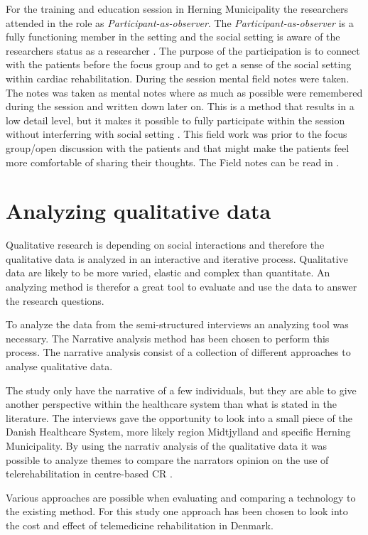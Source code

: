 For the training and education session in Herning Municipality the researchers attended in the role as \textit{Participant-as-observer}. The \textit{Participant-as-observer} is a fully functioning member in the setting and the social setting is aware of the researchers status as a researcher \cite{Gold1958roles}. The purpose of the participation is to connect with the patients before the focus group and to get a sense of the social setting within cardiac rehabilitation. During the session mental field notes were taken. The notes was taken as mental notes where as much as possible were remembered during the session and written down later on. This is a method that results in a low detail level, but it makes it possible to fully participate within the session without interferring with social setting \cite{lofland1995analyzing}. This field work was prior to the focus group/open discussion with the patients and that might make the patients feel more comfortable of sharing their thoughts. The Field notes can be read in .

\section{Analyzing qualitative data}

Qualitative research is depending on social interactions and therefore the qualitative data is analyzed in an interactive and iterative process. Qualitative data are likely to be more varied, elastic and complex than quantitate. An analyzing method is therefor a great tool to evaluate and use the data to answer the research questions. 

To analyze the data from the semi-structured interviews an analyzing tool was necessary. The Narrative analysis method has been chosen to perform this process. The narrative analysis consist of a collection of different approaches to analyse qualitative data. 

The study only have the narrative of a few individuals, but they are able to give another perspective within the healthcare system than what is stated in the literature. The interviews gave the opportunity to look into a small piece of the Danish Healthcare System, more likely region Midtjylland and specific Herning Municipality. By using the narrativ analysis of the qualitative data it was possible to analyze themes to compare the narrators opinion on the use of telerehabilitation in centre-based CR \cite{mark2009research}. 

 Various approaches are possible when evaluating and comparing a technology to the existing method. For this study one approach has been chosen to look into the cost and effect of telemedicine rehabilitation in Denmark.

